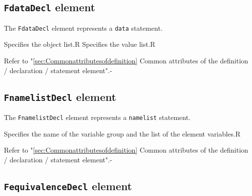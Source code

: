 \subsection{ {\tt FdataDecl} element}

The {\tt FdataDecl} element represents a {\tt data} statement.


\begin{XcodeMLChildElements}
{Specifies the object list.}{R}
{Specifies the value list.}{R}
\end{XcodeMLChildElements}

\begin{XcodeMLAttributes}
{Refer to "\ref{sec:Commonattributesofdefinition} Common attributes of the definition / declaration / statement element".}{-}
\end{XcodeMLAttributes}


\subsection{ {\tt FnamelistDecl} element}

The {\tt FnamelistDecl} element represents a {\tt namelist} statement.


\begin{XcodeMLChildElements}
{Specifies the name of the variable group and the list of the element variables.}{R}
\end{XcodeMLChildElements}

\begin{XcodeMLAttributes}
{Refer to "\ref{sec:Commonattributesofdefinition} Common attributes of the definition / declaration / statement element".}{-}
\end{XcodeMLAttributes}


\subsection{ {\tt FequivalenceDecl} element}

